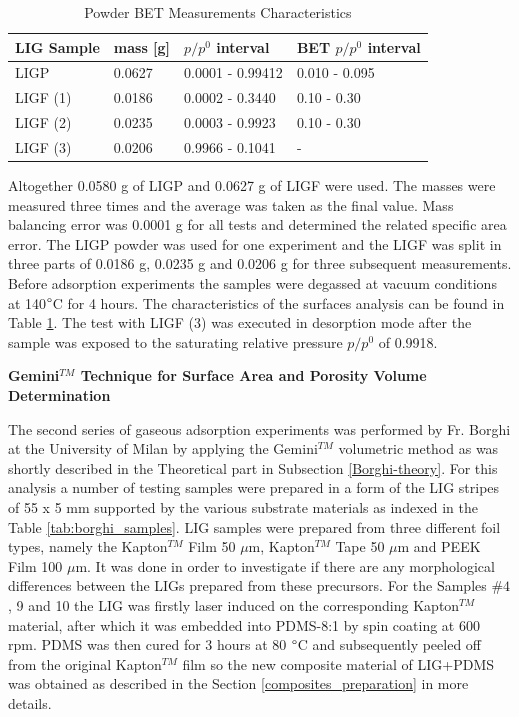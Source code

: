 \begin{table}[H]
\centering
    \caption{Powder BET Measurements Characteristics}
    \label{tab:powder_BET_settings} 
\medskip
\medskip
\begin{tabular}{ l | l | l | l } 

LIG Sample\footnotemark[1] & mass [g] & $p/p^0$ interval & BET $p/p^0$ interval \\[15px]
\hline
LIGP     & 0.0627 & 0.0001 - 0.99412 & 0.010 - 0.095 \\[15px]
LIGF (1) & 0.0186 & 0.0002 - 0.3440  & 0.10 - 0.30  \\[15px]
LIGF (2) & 0.0235 & 0.0003 - 0.9923  & 0.10 - 0.30  \\[15px]
LIGF (3) & 0.0206 & 0.9966 - 0.1041  &  -            \\[15px]

\end{tabular}
\end{table}



Altogether 0.0580 g of LIGP and 0.0627 g of LIGF were used. The masses were measured three times and the average was taken as the final value. Mass balancing error was 0.0001 g for all tests and determined the related specific area error. The LIGP powder was used for one experiment and the LIGF was split in three parts of 0.0186 g, 0.0235 g and 0.0206 g for three subsequent measurements. Before adsorption experiments the samples were degassed at vacuum conditions at 140\:$\degree$C for 4 hours. The characteristics of the surfaces analysis can be found in Table \ref{tab:powder_BET_settings}. The test with LIGF (3) was executed in desorption mode after the sample was exposed to the saturating relative pressure $p/p^0$ of 0.9918. 

\medskip
\textbf{Gemini$^{TM}$ Technique for Surface Area and Porosity Volume Determination}

The second series of gaseous adsorption experiments was performed by Fr. Borghi at the University of Milan by applying the Gemini$^{TM}$ volumetric method as was shortly described in the Theoretical part in Subsection \ref{Borghi-theory}. For this analysis a number of testing samples were prepared in a form of the LIG stripes of 55 x 5 mm supported by the various substrate materials as indexed in the Table \ref{tab:borghi_samples}. LIG samples were prepared from three different foil types, namely the Kapton$^{TM}$ Film 50 $\mu$m, Kapton$^{TM}$ Tape 50  $\mu$m and PEEK Film 100 $\mu$m. It was done in order to investigate if there are any morphological differences between the LIGs prepared from these precursors. For the Samples $\#4$, 9 and 10 the LIG was firstly laser induced on the corresponding Kapton$^{TM}$ material, after which it was embedded into PDMS-8:1 by spin coating at 600 rpm. PDMS was then cured for 3 hours at 80 $\degree$C and subsequently peeled off from the original Kapton$^{TM}$ film so the new composite material of LIG+PDMS was obtained as described in the Section \ref{composites_preparation} in more details.

